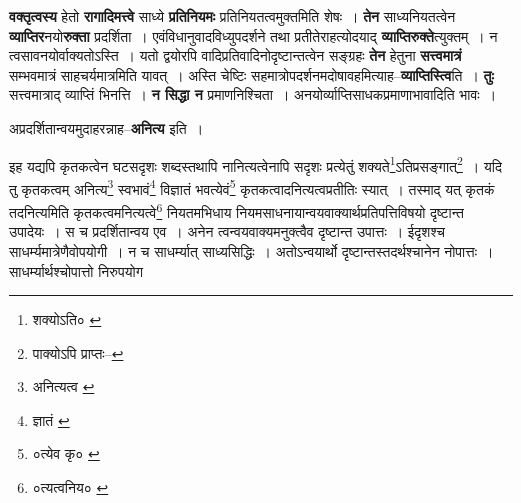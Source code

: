\documentclass[article,12pt,a4paper]{memoir}
\begin{document}
	  \pstart \textbf{वक्तृत्वस्य} हेतो \textbf{रागादिमत्त्वे} \leavevmode{} साध्ये \textbf{प्रतिनियमः} प्रतिनियतत्वमुक्तमिति शेषः । \textbf{तेन} साध्यनियतत्वेन \textbf{व्याप्तिर}नयो\textbf{रुक्ता} प्रदर्शिता । एवंविधानुवादविध्युपदर्शने तथा प्रतीतेराहत्योदयाद् \textbf{व्याप्तिरुक्ते}त्युक्तम् । न त्वसावनयोर्वाक्यतोऽस्ति । यतो द्वयोरपि वादिप्रतिवादिनोदृष्टान्तत्वेन सङ्ग्रहः \textbf{तेन} हेतुना \textbf{सत्त्वमात्रं} सम्भवमात्रं साहचर्यमात्रमिति यावत् । अस्ति चेष्टिः सहमात्रोपदर्शनमदोषावहमित्याह--\textbf{व्याप्तिस्त्वि}ति । \textbf{तुः} सत्त्वमात्राद् व्याप्तिं भिनत्ति । \textbf{न सिद्धा न} प्रमाणनिश्चिता । अनयोर्व्याप्तिसाधकप्रमाणाभावादिति भावः ।
	\pend
      

	  \pstart अप्रदर्शितान्वयमुदाहरन्नाह--\textbf{अनित्य} इति ।
	\pend
      \leavevmode{}
	  \bigskip
	  \begingroup
	

	  \pstart इह यद्यपि कृतकत्वेन घटसदृशः शब्दस्तथापि नानित्यत्वेनापि सदृशः प्रत्येतुं शक्यते\footnote{शक्योऽति० \cite{dp-msA} \cite{dp-edP} \cite{dp-edH} \cite{dp-edE} \cite{dp-edN}}ऽतिप्रसङ्गात्\footnote{पाक्योऽपि प्राप्तः--\cite{dp-msD-n}} । यदि तु कृतकत्वम् अनित्य\footnote{अनित्यत्व \cite{dp-msA} \cite{dp-msC} \cite{dp-edP} \cite{dp-edH} \cite{dp-edE} \cite{dp-edN}} स्वभावं\footnote{ज्ञातं \cite{dp-msC}} विज्ञातं भवत्येवं\footnote{०त्येव कृ० \cite{dp-msC}} कृतकत्वादनित्यत्वप्रतीतिः स्यात् । तस्माद् यत् कृतकं तदनित्यमिति कृतकत्वमनित्यत्वे\footnote{०त्यत्वनिय० \cite{dp-msA} \cite{dp-edP} \cite{dp-edH} \cite{dp-edE} \cite{dp-edN}} नियतमभिधाय नियमसाधनायान्वयवाक्यार्थप्रतिपत्तिविषयो दृष्टान्त उपादेयः । स च प्रदर्शितान्वय एव । अनेन त्वन्वयवाक्यमनुक्त्वैव दृष्टान्त उपात्तः । ईदृशश्च साधर्म्यमात्रेणैवोपयोगी । न च साधर्म्यात् साध्यसिद्धिः । अतोऽन्वयार्थो दृष्टान्तस्तदर्थश्चानेन नोपात्तः । साधर्म्यार्थश्चोपात्तो निरुपयोग
	\pend
      
	  \endgroup
	
\end{document}
